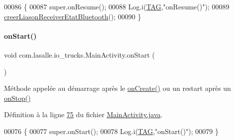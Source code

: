 \begin{DoxyCode}
00086     \{
00087         super.onResume();
00088         Log.i(\hyperlink{classcom_1_1lasalle_1_1io__trucks_1_1_main_activity_a37b90dba972711328e3f4c83c55eb0fc}{TAG},\textcolor{stringliteral}{"onResume()"});
00089         \hyperlink{classcom_1_1lasalle_1_1io__trucks_1_1_main_activity_a14d1db05fdfec7536d6b7c9809e360a0}{creerLiasonReceiverEtatBluetooth}();
00090     \}
\end{DoxyCode}
\mbox{\label{classcom_1_1lasalle_1_1io__trucks_1_1_main_activity_a88715b4d1f7b33b3871849de4c667abf}} 
\paragraph{\texorpdfstring{on\+Start()}{onStart()}}
{\footnotesize\ttfamily void com.\+lasalle.\+io\+\_\+trucks.\+Main\+Activity.\+on\+Start (\begin{DoxyParamCaption}{ }\end{DoxyParamCaption})\hspace{0.3cm}{\ttfamily [protected]}}



Méthode appelée au démarrage après le \hyperlink{classcom_1_1lasalle_1_1io__trucks_1_1_main_activity_a236d8585ed546ef42c0d2dfd3268893a}{on\+Create()} ou un restart après un \hyperlink{classcom_1_1lasalle_1_1io__trucks_1_1_main_activity_a6fbad98934d4b04260faff49da3d52ad}{on\+Stop()} 



Définition à la ligne \hyperlink{_main_activity_8java_source_l00075}{75} du fichier \hyperlink{_main_activity_8java_source}{Main\+Activity.\+java}.


\begin{DoxyCode}
00076     \{
00077         super.onStart();
00078         Log.i(\hyperlink{classcom_1_1lasalle_1_1io__trucks_1_1_main_activity_a37b90dba972711328e3f4c83c55eb0fc}{TAG},\textcolor{stringliteral}{"onStart()"});
00079     \}
\end{DoxyCode}
\mbox{\label{classcom_1_1lasalle_1_1io__trucks_1_1_main_activity_a6fbad98934d4b04260faff49da3d52ad}} 
